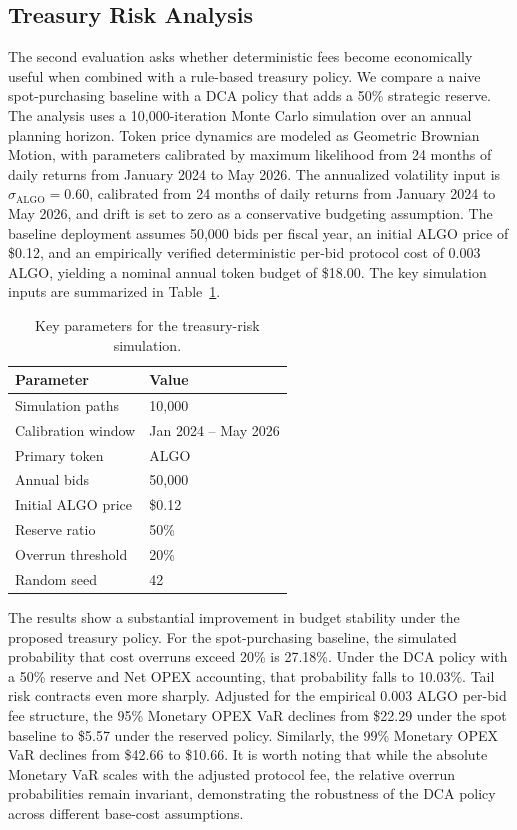 \documentclass[runningheads]{llncs}
\begin{document}
\subsection{Treasury Risk Analysis}

The second evaluation asks whether deterministic fees become economically useful
when combined with a rule-based treasury policy. We compare a naive
spot-purchasing baseline with a DCA policy that adds a 50\% strategic reserve.
The analysis uses a 10{,}000-iteration Monte Carlo simulation over an annual
planning horizon. Token price dynamics are modeled as Geometric Brownian
Motion, with parameters calibrated by maximum likelihood from 24 months of
daily returns from January 2024 to May 2026. The annualized volatility input is $\sigma_{\text{ALGO}}=0.60$, calibrated from
24 months of daily returns from January 2024 to May 2026, and drift is set to
zero as a conservative budgeting assumption. The baseline deployment assumes
50{,}000 bids per fiscal year, an initial ALGO price of \$0.12, and an empirically verified deterministic
per-bid protocol cost of 0.003 ALGO, yielding a nominal annual token budget
of \$18.00. The key simulation inputs are summarized in
Table~\ref{tab:sim-params}.

\begin{table}[t]
\caption{Key parameters for the treasury-risk simulation.}
\label{tab:sim-params}
\centering
\begin{tabular}{ll}
\hline
Parameter & Value \\
\hline
Simulation paths & 10{,}000 \\
Calibration window & Jan 2024 -- May 2026 \\
Primary token & ALGO \\
Annual bids & 50{,}000 \\
Initial ALGO price & \$0.12 \\
Reserve ratio & 50\% \\
Overrun threshold & 20\% \\
Random seed & 42 \\
\hline
\end{tabular}
\end{table}

The results show a substantial improvement in budget stability under the
proposed treasury policy. For the spot-purchasing baseline, the simulated
probability that cost overruns exceed 20\% is 27.18\%. Under the DCA policy
with a 50\% reserve and Net OPEX accounting, that probability falls to 10.03\%.
Tail risk contracts even more sharply. Adjusted for the empirical 0.003 ALGO per-bid fee structure, the 95\% Monetary OPEX VaR declines from \$22.29 under the spot baseline to \$5.57 under the reserved policy. Similarly, the 99\% Monetary OPEX VaR declines from \$42.66 to \$10.66. It is worth noting that while the absolute Monetary VaR scales with the adjusted protocol fee, the relative overrun probabilities remain invariant, demonstrating the robustness of the DCA policy across different base-cost assumptions.
\end{document}
